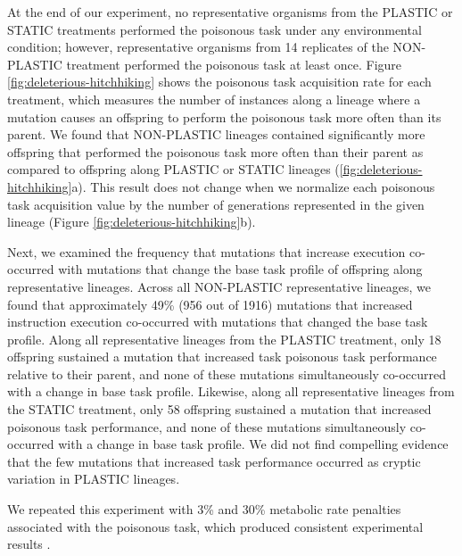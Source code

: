 At the end of our experiment, no representative organisms from the PLASTIC or STATIC treatments performed the poisonous task under any environmental condition; however, representative organisms from 14 replicates of the NON-PLASTIC treatment performed the poisonous task at least once. %
Figure \ref{fig:deleterious-hitchhiking} shows the poisonous task acquisition rate for each treatment, which measures the number of instances along a lineage where a mutation causes an offspring to perform the poisonous task more often than its parent. 
We found that NON-PLASTIC lineages contained significantly more offspring that performed the poisonous task more often than their parent as compared to offspring along PLASTIC or STATIC lineages (\ref{fig:deleterious-hitchhiking}a).
This result does not change when we normalize each poisonous task acquisition value by the number of generations represented in the given lineage (Figure \ref{fig:deleterious-hitchhiking}b).

Next, we examined the frequency that mutations that increase  execution co-occurred with mutations that change the base task profile of offspring along representative lineages.
Across all NON-PLASTIC representative lineages, we found that approximately 49\% (956 out of 1916) mutations that increased  instruction execution co-occurred with mutations that changed the base task profile.
Along all representative lineages from the PLASTIC treatment, only 18 offspring sustained a mutation that increased task poisonous task performance relative to their parent, and none of these mutations simultaneously co-occurred with a change in base task profile.
Likewise, along all representative lineages from the STATIC treatment, only 58 offspring sustained a mutation that increased poisonous task performance, and none of these mutations simultaneously co-occurred with a change in base task profile.
We did not find compelling evidence that the few mutations that increased  task performance occurred as cryptic variation in PLASTIC lineages.

We repeated this experiment with 3\% and 30\% metabolic rate penalties associated with the poisonous task, which produced consistent experimental results \citep{supplemental_material}.